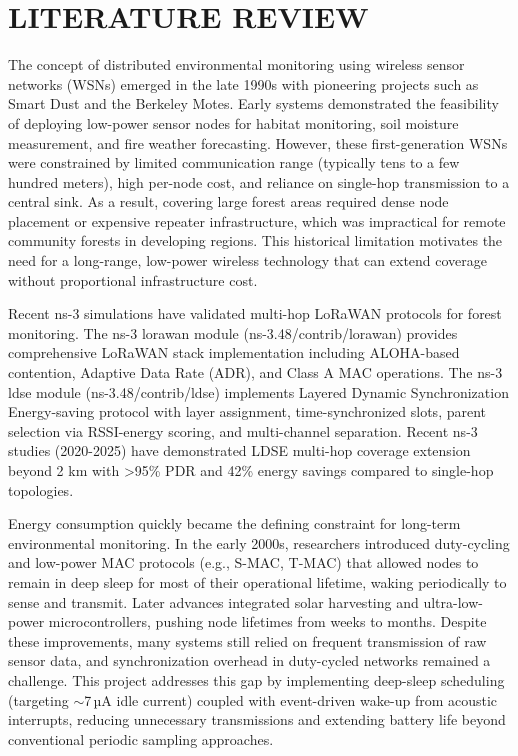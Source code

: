 
\chapter{LITERATURE REVIEW}

The concept of distributed environmental monitoring using wireless sensor networks (WSNs) emerged in the late 1990s with pioneering projects such as Smart Dust and the Berkeley Motes. Early systems demonstrated the feasibility of deploying low-power sensor nodes for habitat monitoring, soil moisture measurement, and fire weather forecasting. However, these first-generation WSNs were constrained by limited communication range (typically tens to a few hundred meters), high per-node cost, and reliance on single-hop transmission to a central sink. As a result, covering large forest areas required dense node placement or expensive repeater infrastructure, which was impractical for remote community forests in developing regions\cite{rundel2009environmental}. This historical limitation motivates the need for a long-range, low-power wireless technology that can extend coverage without proportional infrastructure cost.

Recent ns-3 simulations have validated multi-hop LoRaWAN protocols for forest monitoring. The ns-3 lorawan module (ns-3.48/contrib/lorawan) provides comprehensive LoRaWAN stack implementation including ALOHA-based contention, Adaptive Data Rate (ADR), and Class A MAC operations. The ns-3 ldse module (ns-3.48/contrib/ldse) implements Layered Dynamic Synchronization Energy-saving protocol with layer assignment, time-synchronized slots, parent selection via RSSI-energy scoring, and multi-channel separation. Recent ns-3 studies (2020-2025) have demonstrated LDSE multi-hop coverage extension beyond 2 km with >95\% PDR and 42\% energy savings compared to single-hop topologies.

Energy consumption quickly became the defining constraint for long-term environmental monitoring. In the early 2000s, researchers introduced duty-cycling and low-power MAC protocols (e.g., S-MAC, T-MAC) that allowed nodes to remain in deep sleep for most of their operational lifetime, waking periodically to sense and transmit. Later advances integrated solar harvesting and ultra-low-power microcontrollers, pushing node lifetimes from weeks to months. Despite these improvements, many systems still relied on frequent transmission of raw sensor data, and synchronization overhead in duty-cycled networks remained a challenge. This project addresses this gap by implementing deep-sleep scheduling (targeting $\sim$7\,µA idle current) coupled with event-driven wake-up from acoustic interrupts, reducing unnecessary transmissions and extending battery life beyond conventional periodic sampling approaches.\cite{javaid2013energy}

